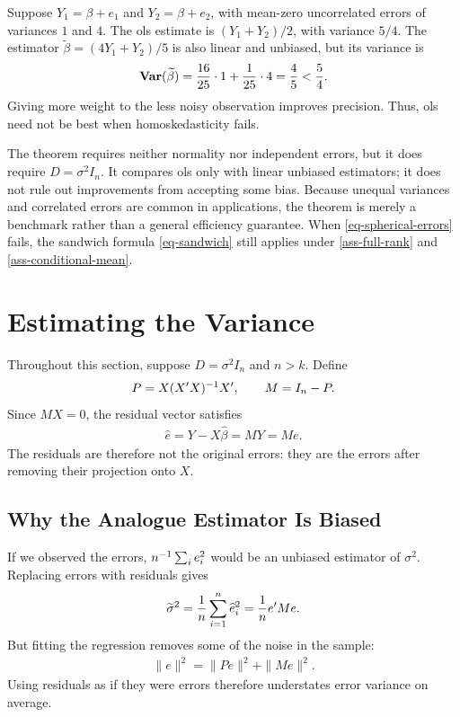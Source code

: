 \documentclass[a4paper,12pt]{article}
\begin{document}
\begin{example}
	Suppose $Y_1=\beta+e_1$ and $Y_2=\beta+e_2$, with mean-zero uncorrelated errors of variances $1$ and $4$.
	The \gls{ols} estimate is $(Y_1+Y_2)/2$, with variance $5/4$.
	The estimator $\widetilde\beta=(4Y_1+Y_2)/5$ is also linear and unbiased, but its variance is
	\begin{align*}
		\operatorname{\text{\textrm{\upshape\textbf{Var}}}}(\widetilde\beta)=\frac{16}{25}\cdot1+\frac{1}{25}\cdot4=\frac45<\frac54.
	\end{align*}
	Giving more weight to the less noisy observation improves precision.
	Thus, \gls{ols} need not be best when homoskedasticity fails.
\end{example}

\begin{remark}
	The theorem requires neither normality nor independent errors, but it does require $D=\sigma^2 I_n$.
	It compares \gls{ols} only with linear unbiased estimators; it does not rule out improvements from accepting some bias.
	Because unequal variances and correlated errors are common in applications,
	the theorem is merely a benchmark rather than a general efficiency guarantee.
	When \eqref{eq-spherical-errors} fails,
	the sandwich formula \eqref{eq-sandwich} still applies under \autoref{ass-full-rank} and \ref{ass-conditional-mean}.
\end{remark}

\section{Estimating the Variance}

Throughout this section, suppose $D=\sigma^2 I_n$ and $n>k$.
Define
\begin{align*}
	P=X(X^{\prime} X)^{-1} X^{\prime},
	\qquad M=I_n-P.
\end{align*}
Since $MX=0$, the residual vector satisfies
\begin{align}\label{eq-residual-error}
	\widehat e=Y-X\widehat\beta=MY=Me.
\end{align}
The residuals are therefore not the original errors: they are the errors after removing their projection onto $X$.

\subsection{Why the Analogue Estimator Is Biased}

If we observed the errors, $n^{-1}\sum_i e_i^2$ would be an unbiased estimator of $\sigma^2$.
Replacing errors with residuals gives
\begin{align*}
	\widetilde\sigma^2=\frac1n\sum_{i=1}^n\widehat e_i^2=\frac1n e^{\prime} M e.
\end{align*}
But fitting the regression removes some of the noise in the sample:
\begin{align*}
	\|e\|^2=\|Pe\|^2+\|Me\|^2.
\end{align*}
Using residuals as if they were errors therefore understates error variance on average.
\end{document}
